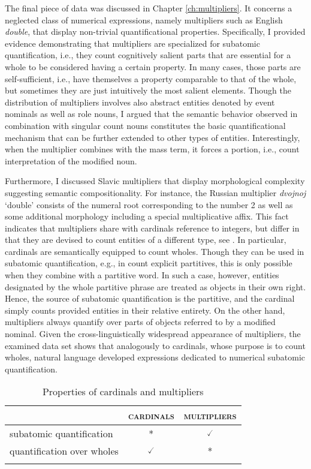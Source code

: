 The final piece of data was discussed in Chapter \ref{ch:multipliers}. It concerns a neglected class of numerical expressions, namely multipliers such as English \textit{double}, that display non-trivial quantificational properties. Specifically, I provided evidence demonstrating that multipliers are specialized for subatomic quantification, i.e., they count cognitively salient parts that are essential for a whole to be considered having a certain property. In many cases, those parts are self-sufficient, i.e., have themselves a property comparable to that of the whole, but sometimes they are just intuitively the most salient elements. Though the distribution of multipliers involves also abstract entities denoted by event nominals as well as role nouns, I argued that the semantic behavior observed in combination with singular count nouns constitutes the basic quantificational mechanism that can be further extended to other types of entities. Interestingly, when the multiplier combines with the mass term, it forces a portion, i.e., count interpretation of the modified noun.

Furthermore, I discussed Slavic multipliers that display morphological complexity suggesting semantic compositionality. For instance, the Russian multiplier \textit{dvojnoj} `double' consists of the numeral root corresponding to the number 2 as well as some additional morphology including a special multiplicative affix. This fact indicates that multipliers share with cardinals reference to integers, but differ in that they are devised to count entities of a different type, see . In particular, cardinals are semantically equipped to count wholes. Though they can be used in subatomic quantification, e.g., in count explicit partitives, this is only possible when they combine with a partitive word. In such a case, however, entities designated by the whole partitive phrase are treated as objects in their own right. Hence, the source of subatomic quantification is the partitive, and the cardinal simply counts provided entities in their relative entirety. On the other hand, multipliers always quantify over parts of objects referred to by a modified nominal. Given the cross-linguistically widespread appearance of multipliers, the examined data set shows that analogously to cardinals, whose purpose is to count wholes, natural language developed expressions dedicated to numerical subatomic quantification.

    \begin{table}[h!]
    \centering
\begin{tabular}{lcc}
\lsptoprule
                           & \textsc{cardinals} & \textsc{multipliers}  \\ \midrule
subatomic quantification   & *               & $\checked$    \\
quantification over wholes & $\checked$               & *    \\ \lspbottomrule
\end{tabular}
\caption{Properties of cardinals and multipliers}
\label{tab:properties-of-cardinals-and-multipliers2}
\end{table}

